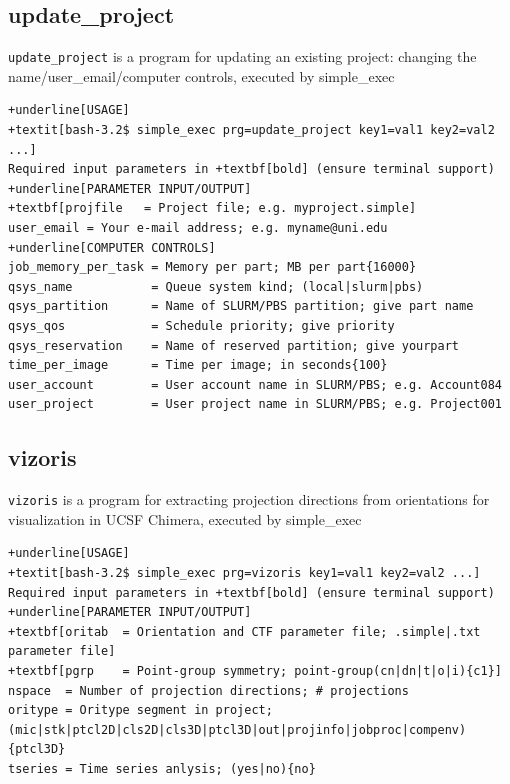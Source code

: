 \documentclass[a4paper,11pt]{article}
\newcommand{\prgname}[1]{\textcolor{NavyBlue}{\texttt{#1}}}
\begin{document}
\subsection{update\_project}
\label{update_project}
\prgname{update\_project} is a program for updating an existing project: changing the name/user\_email/computer controls, executed by simple\_exec
\begin{Verbatim}[commandchars=+\[\],fontsize=\small,breaklines=true]
+underline[USAGE]
+textit[bash-3.2$ simple_exec prg=update_project key1=val1 key2=val2 ...]
Required input parameters in +textbf[bold] (ensure terminal support)
+underline[PARAMETER INPUT/OUTPUT]
+textbf[projfile   = Project file; e.g. myproject.simple]
user_email = Your e-mail address; e.g. myname@uni.edu
+underline[COMPUTER CONTROLS]
job_memory_per_task = Memory per part; MB per part{16000}
qsys_name           = Queue system kind; (local|slurm|pbs)
qsys_partition      = Name of SLURM/PBS partition; give part name
qsys_qos            = Schedule priority; give priority
qsys_reservation    = Name of reserved partition; give yourpart
time_per_image      = Time per image; in seconds{100}
user_account        = User account name in SLURM/PBS; e.g. Account084
user_project        = User project name in SLURM/PBS; e.g. Project001
\end{Verbatim}

\subsection{vizoris}
\label{vizoris}
\prgname{vizoris} is a program for extracting projection directions from orientations for visualization in UCSF Chimera, executed by simple\_exec
\begin{Verbatim}[commandchars=+\[\],fontsize=\small,breaklines=true]
+underline[USAGE]
+textit[bash-3.2$ simple_exec prg=vizoris key1=val1 key2=val2 ...]
Required input parameters in +textbf[bold] (ensure terminal support)
+underline[PARAMETER INPUT/OUTPUT]
+textbf[oritab  = Orientation and CTF parameter file; .simple|.txt parameter file]
+textbf[pgrp    = Point-group symmetry; point-group(cn|dn|t|o|i){c1}]
nspace  = Number of projection directions; # projections
oritype = Oritype segment in project; (mic|stk|ptcl2D|cls2D|cls3D|ptcl3D|out|projinfo|jobproc|compenv){ptcl3D}
tseries = Time series anlysis; (yes|no){no}
\end{Verbatim}
\end{document}
